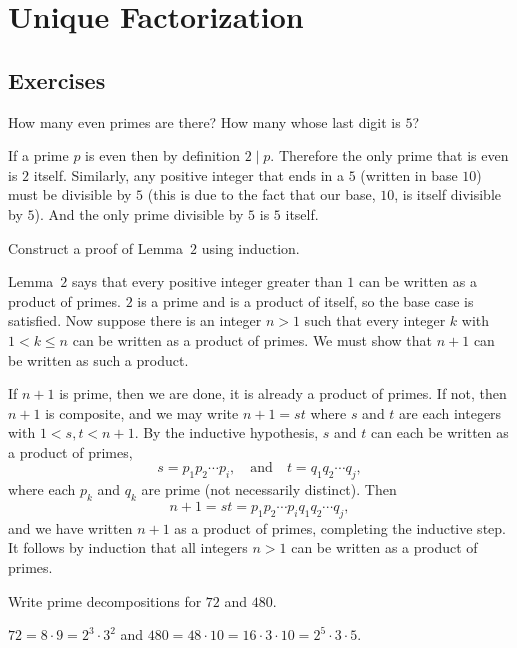 \chapter{Unique Factorization}

\section{Exercises}

 How many even primes are there? How many whose last digit
is $5$?
\begin{solution}
  If a prime $p$ is even then by definition $2\mid p$. Therefore the
  only prime that is even is $2$ itself. Similarly, any positive
  integer that ends in a $5$ (written in base $10$) must be divisible
  by $5$ (this is due to the fact that our base, $10$, is itself
  divisible by $5$). And the only prime divisible by $5$ is $5$
  itself.
\end{solution}

 Construct a proof of Lemma~$2$ using induction.
\begin{solution}
  Lemma~$2$ says that every positive integer greater than $1$ can be
  written as a product of primes. $2$ is a prime and is a product of
  itself, so the base case is satisfied. Now suppose there is an
  integer $n>1$ such that every integer $k$ with $1<k\leq n$ can be
  written as a product of primes. We must show that $n+1$ can be
  written as such a product.

  If $n+1$ is prime, then we are done, it is already a product of
  primes. If not, then $n+1$ is composite, and we may write $n+1 = st$
  where $s$ and $t$ are each integers with $1<s,t<n+1$. By the
  inductive hypothesis, $s$ and $t$ can each be written as a product
  of primes,
  \begin{equation*}
    s = p_1p_2\cdots p_i,
    \quad\text{and}\quad
    t = q_1q_2\cdots q_j,
  \end{equation*}
  where each $p_k$ and $q_k$ are prime (not necessarily
  distinct). Then
  \begin{equation*}
    n+1 = st = p_1p_2\cdots p_iq_1q_2\cdots q_j,
  \end{equation*}
  and we have written $n+1$ as a product of primes, completing the
  inductive step. It follows by induction that all integers $n>1$ can
  be written as a product of primes.
\end{solution}

 Write prime decompositions for $72$ and $480$.
\begin{solution}
  $72 = 8\cdot9 = 2^3\cdot3^2$ and
  $480 = 48\cdot10 = 16\cdot3\cdot10 = 2^5\cdot3\cdot5$.
\end{solution}
